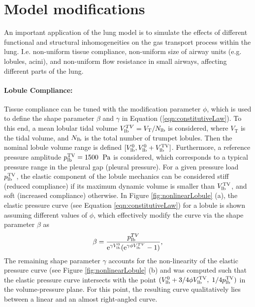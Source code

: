 \section{Model modifications} \label{sec:model_modifications}
An important application of the lung model is to simulate the effects of different functional and structural inhomogeneities on the gas transport process within the lung.
I.e. non-uniform tissue compliance, non-uniform size of airway units (e.g. lobules, acini), and non-uniform flow resistance in small airways, affecting different parts of the lung.

\paragraph{Lobule Compliance: }
Tissue compliance can be tuned with the modification parameter $\phi$, which is used to define the shape parameter $\beta$ and $\gamma$ in Equation (\ref{eqn:constitutiveLaw}).
To this end, a mean lobular tidal volume $V_{\mathrm{lb}}^{TV} = V_\mathrm{T}/N_{\mathrm{lb}}$ is considered, where $V_\mathrm{T}$ is the tidal volume, and $N_{\mathrm{lb}}$ is the total number of trumpet lobules.
Then the nominal lobule volume range is defined $[V_{\mathrm{lb}}^0, V_{\mathrm{lb}}^0+V_{\mathrm{lb}}^\mathrm{TV}]$.
Furthermore, a reference pressure amplitude $p_{\mathrm{lb}}^\mathrm{TV} = 1500\;~\mathrm{Pa}$ is considered, which corresponds to a typical pressure range in the pleural gap (pleural pressure).
For a given pressure load $p_{\mathrm{lb}}^\mathrm{TV}$, the elastic component of the lobule mechanics can be considered stiff (reduced compliance) if its maximum dynamic volume is smaller than $V_{\mathrm{lb}}^\mathrm{TV}$, and soft (increased compliance) otherwise.
In Figure \ref{fig:nonlinearLobule} (a), the elastic pressure curve (see Equation \ref{eqn:constitutiveLaw}) for a lobule is shown assuming different values of $\phi$, which effectively modify the curve via the shape parameter $\beta$ as
\begin{equation} \label{eqn:compliance_modification}
\beta = \frac{p_\mathrm{lb}^{TV}}{\mathrm{e}^{\gamma V_\mathrm{lb}^0}(\mathrm{e}^{\gamma \phi V_\mathrm{lb}^{TV}} - 1)} \text{,}
\end{equation}
The remaining shape parameter $\gamma$ accounts for the non-linearity of the elastic pressure curve (see Figure \ref{fig:nonlinearLobule} (b) and was computed such that the elastic pressure curve intersects with the point $(V_{\mathrm{lb}}^0 + 3/4\phi V_{\mathrm{lb}}^\mathrm{TV}, \; 1/4 p_{\mathrm{lb}}^\mathrm{TV})$ in the volume-pressure plane.
For this point, the resulting curve qualitatively lies between a linear and an almost right-angled curve.


